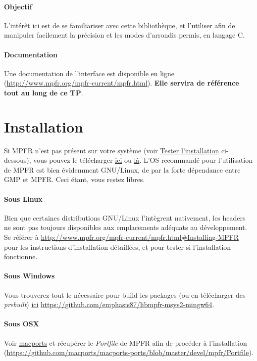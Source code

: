 \documentclass[a4paper,11pt]{exam}
\begin{document}
\paragraph{Objectif} L'intérêt ici est de se familiariser avec cette bibliothèque, et l'utiliser afin de manipuler facilement la précision et les modes d'arrondis permis, en langage C.  
\paragraph{Documentation} Une documentation de l'interface est disponible en ligne (\url{http://www.mpfr.org/mpfr-current/mpfr.html}). \textbf{Elle servira de référence tout au long de ce TP}.

\section{Installation}
Si MPFR n'est pas présent sur votre système (voir \hyperref[testInstall]{Tester l'installation} ci-dessous), vous pouvez le télécharger \href{http://www.mpfr.org/}{ici} ou \href{https://ftp.gnu.org/gnu/mpfr/}{là}.
L'OS recommandé pour l'utilisation de MPFR est bien évidemment GNU/Linux, de par la forte dépendance entre GMP et MPFR. Ceci étant, vous restez libres.
\paragraph{Sous Linux}
Bien que certaines distributions GNU/Linux l'intègrent nativement, les headers ne sont pas toujours disponibles aux emplacements adéquats au développement.\\
Se référer à \url{http://www.mpfr.org/mpfr-current/mpfr.html\#Installing-MPFR} pour les instructions d'installation détaillées, et pour tester si l'installation fonctionne.

\paragraph{Sous Windows}
Vous trouverez tout le nécessaire pour build les packages (ou en télécharger des \emph{prebuilt}) \href{https://github.com/emphasis87/libmpfr-msys2-mingw64}{ici} \url{https://github.com/emphasis87/libmpfr-msys2-mingw64}.

\paragraph{Sous OSX} 
Voir \href{https://github.com/macports/macports-ports}{macports} et récupérer le \emph{Portfile} de MPFR afin de procéder à l'installation (\url{https://github.com/macports/macports-ports/blob/master/devel/mpfr/Portfile}).
\end{document}
